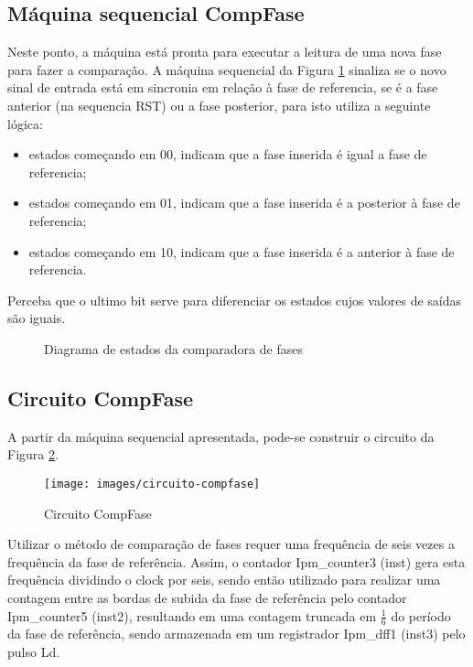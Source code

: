 \documentclass[12pt,a4paper,openany]{abntex2}
\begin{document}
\subsection{Máquina sequencial CompFase}

Neste ponto, a máquina está pronta para executar a leitura de uma nova fase para fazer a comparação. A máquina sequencial da Figura \ref{fig:comp-fase} sinaliza se o novo sinal de entrada está em sincronia em relação à fase de referencia, se é a fase anterior (na sequencia RST) ou a fase posterior, para isto utiliza a seguinte lógica:
\begin{itemize}
	\item estados começando em 00, indicam que a fase inserida é igual a fase de referencia;
	\item estados começando em 01, indicam que a fase inserida é a posterior à fase de referencia;
	\item estados começando em 10, indicam que a fase inserida é a anterior à fase de referencia.
\end{itemize}

Perceba que o ultimo bit serve para diferenciar os estados cujos valores de saídas são iguais.

\begin{figure}[!htp]
	\centering
	\caption{Diagrama de estados da comparadora de fases}
	\label{fig:comp-fase}
\end{figure}

\subsection{Circuito CompFase}

A partir da máquina sequencial apresentada, pode-se construir o circuito da Figura \ref{fig:circuito-compfase}.

\begin{figure}[!htp]
	\centering
	\caption{Circuito CompFase}
	\texttt{[image: images/circuito-compfase]}	\label{fig:circuito-compfase}
\end{figure}

Utilizar o método de comparação de fases requer uma frequência de seis vezes a frequência da fase de referência. Assim, o contador Ipm\_counter3 (inst) gera esta frequência dividindo o clock por seis, sendo então utilizado para realizar uma contagem entre as bordas de subida da fase de referência pelo contador Ipm\_counter5 (inst2), resultando em uma contagem truncada em $\frac{1}{6}$ do período da fase de referência, sendo armazenada em um registrador Ipm\_dff1 (inst3) pelo pulso Ld.
\end{document}
